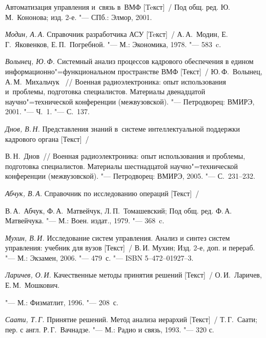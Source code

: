 \begin{thebibliography}{}

\item{}Автоматизация управления и~связь в~ВМФ [Teкст]~/ Под общ. ред. Ю.\,М.~Кононова; изд. 2-е. "--- СПб.: Элмор, 2001.



\item\emph{Модин, А.\,А.} Справочник разработчика АСУ [Teкст]~/ А.\,А.~Модин, Е.\,Г.~Яковенков, Е.\,П.~Погребной. "--- М.: Экономика, 1978. "--- 583~c.



\item\emph{Волынец, Ю.\,Ф.} Системный анализ процессов кадрового обеспечения в едином информационно"=функциональном пространстве ВМФ [Текст]~/ Ю.\,Ф.~Волынец,  А.\,М.~Михальчук~ /\!/ Военная радиоэлектроника: опыт использования и~проблемы, подготовка специалистов. Материалы двенадцатой научно"=технической конференции (межвузовской). "--- Петродворец: ВМИРЭ, 2001. "---  Ч.~1. "--- С.~137.



\item\emph{Днов, В.\,Н.} Представления знаний в~системе интеллектуальной поддержки кадрового органа [Текст]~/ 

В.\,Н.~Днов~/\!/ Военная радиоэлектроника: опыт использования и проблемы, подготовка специалистов. Материалы шестнадцатой научно"=технической конференции (межвузовской). "--- Петродворец: ВМИРЭ, 2005. "--- С.~231--232.



\item\emph{Абчук, В.\,А.} Справочник по исследованию операций [Текст]~/ 

В.\,А.~Абчук, Ф.\,А.~Матвейчук, Л.\,П.~Томашевский; Под общ. ред. Ф.\,А. Матвейчука. "--- М.: Воен. издат., 1979. "--- 368~c.



\item\emph{Мухин, В.\,И.} Исследование систем управления. Анализ и синтез систем управления: учебник для вузов [Текст]~/ В.\,И. Мухин; Изд. 2-е, доп. и перераб. "--- М.: Экзамен, 2006. "--- 479~с. "--- ISBN 5--472--01927--3.



\item\emph{Ларичев, О.\,И.} Качественные методы принятия решений [Текст]~/ О.\,И.~Ларичев, Е.\,М.~Мошкович.

"--- М.: Физматлит, 1996. "--- 208~с.



\item\emph{Саати, Т.\,Г.} Принятие решений. Метод анализа иерархий [Текст]~/  Т.\,Г.~Саати; пер. с англ. Р.\,Г.~Вачнадзе. "--- М.: Радио и связь, 1993. "--- 320 с.

\end{thebibliography}



